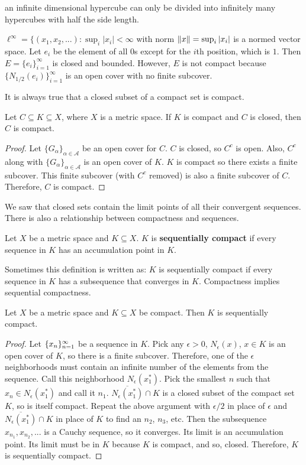 an infinite dimensional hypercube can only be divided into infinitely
many hypercubes with half the side length.
\begin{example}\label{ex:ellinf}
  $\ell^\infty = \{ (x_1, x_2, ...) : \sup_{i} |x_i| < \infty$ with
  norm $\left\Vert {x} \right\Vert = \sup_{i} |x_i|$ is a normed vector space. Let $e_i$
  be the element of all $0$s except for the $i$th position, which is
  $1$. Then $E = \{e_i\}_{i=1}^\infty$ is closed and bounded. However,
  $E$ is not compact because $\{N_{1/2}(e_i)\}_{i=1}^\infty$ is an
  open cover with no finite subcover. 
\end{example}
It is always true that a closed subset of a compact set is compact.
\begin{lemma}
  Let $C \subseteq K \subseteq X$, where $X$ is a metric space.  If
  $K$ is compact and $C$ is closed, then $C$ is compact. 
\end{lemma}
\begin{proof}
  Let $\{G_{\alpha}\}_{\alpha \in \mathcal{A}}$ be an open cover for
  $C$. $C$ is closed, so $C^c$ is open. Also, $C^c$ along with
  $\{G_{\alpha}\}_{\alpha \in \mathcal{A}}$ is an open cover of
  $K$. $K$ is compact so there exists a finite subcover. This finite
  subcover (with $C^c$ removed) is also a finite subcover of
  $C$. Therefore, $C$ is compact. 
\end{proof}

We saw that closed sets contain the limit points of all their
convergent sequences. There is also a relationship between compactness
and sequences. 
\begin{definition}
  Let $X$ be a metric space and $K \subseteq X$. $K$ is
  \textbf{sequentially compact} if every sequence in $K$ has an
  accumulation point in $K$.
\end{definition}
Sometimes this definition is written as: $K$ is sequentially compact
if every sequence in $K$ has a subsequence that converges in
$K$. Compactness implies sequential compactness. 
\begin{lemma}\label{lem:compactSeqCompact}
    Let $X$ be a metric space and $K \subseteq X$ be compact. Then $K$
    is sequentially compact. 
\end{lemma}
\begin{proof}
  Let $\{{x}_n \}_{n=1}^\infty$ be a sequence in
  $K$. Pick any $\epsilon>0$, $N_\epsilon(x)$, $x \in K$ is an open
  cover of $K$, so there is a finite subcover. Therefore, one of the
  $\epsilon$ neighborhoods must contain an infinite number of the
  elements from the sequence. Call this neighborhood
  $N_\epsilon(x_1^\ast)$. Pick the smallest $n$ such that $x_n \in
  N_\epsilon(x_1^\ast)$ and call it $n_1$. $\overline{N_{\epsilon}(x_1^\ast)}
  \cap K$ is a closed subset of the compact set $K$, so is itself
  compact. Repeat the above argument with $\epsilon/2$ in place of
  $\epsilon$ and $\overline{N_{\epsilon}(x_1^\ast)} \cap K$ in place of $K$
  to find an $n_2$, $n_3$, etc. Then the subsequence $x_{n_1},
  x_{n_2}, ...$ is a Cauchy sequence, so it converges. Its limit is an
  accumulation point. Its limit must be in $K$ because $K$ is compact,
  and so, closed. Therefore, $K$ is sequentially compact.
\end{proof}

